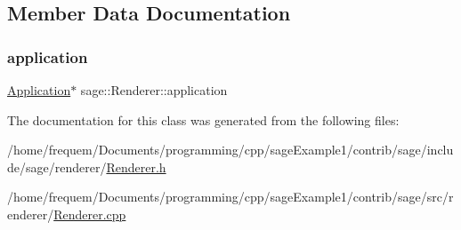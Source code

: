 \subsection{Member Data Documentation}
\mbox{\label{classsage_1_1Renderer_a76559bf364299fb39ce7d9d084d56958}} 
\subsubsection{\texorpdfstring{application}{application}}
{\footnotesize\ttfamily \mbox{\hyperlink{classsage_1_1Application}{Application}}$\ast$ sage\+::\+Renderer\+::application\hspace{0.3cm}{\ttfamily [protected]}}



The documentation for this class was generated from the following files\+:\begin{DoxyCompactItemize}
\item 
/home/frequem/\+Documents/programming/cpp/sage\+Example1/contrib/sage/include/sage/renderer/\mbox{\hyperlink{Renderer_8h}{Renderer.\+h}}\item 
/home/frequem/\+Documents/programming/cpp/sage\+Example1/contrib/sage/src/renderer/\mbox{\hyperlink{Renderer_8cpp}{Renderer.\+cpp}}\end{DoxyCompactItemize}
